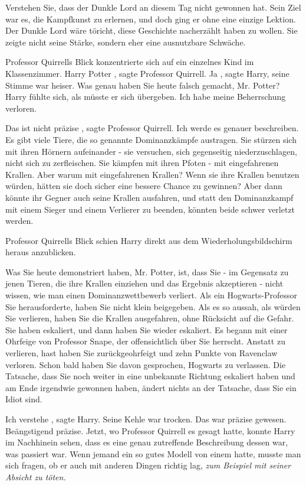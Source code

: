 Verstehen Sie, dass der Dunkle Lord an diesem Tag nicht gewonnen hat. Sein Ziel
war es, die Kampfkunst zu erlernen, und doch ging er ohne eine einzige Lektion.
Der Dunkle Lord wäre töricht, diese Geschichte nacherzählt haben zu wollen. Sie
zeigte nicht seine Stärke, sondern eher eine ausnutzbare Schwäche.\grqq{}

Professor Quirrells Blick konzentrierte sich auf ein einzelnes Kind im
Klassenzimmer. \glqq Harry Potter\grqq{} , sagte Professor Quirrell. \glqq
Ja\grqq{} , sagte Harry, seine Stimme war heiser. \glqq Was genau haben Sie
heute falsch gemacht, Mr. Potter?\grqq{} Harry fühlte sich, als müsste er sich
übergeben. \glqq Ich habe meine Beherrschung verloren.\grqq{}

\glqq Das ist nicht präzise\grqq{} , sagte Professor Quirrell. \glqq Ich werde
es genauer beschreiben. Es gibt viele Tiere, die so genannte Dominanzkämpfe
austragen. Sie stürzen sich mit ihren Hörnern aufeinander - sie versuchen, sich
gegenseitig niederzuschlagen, nicht sich zu zerfleischen. Sie kämpfen mit ihren
Pfoten - mit eingefahrenen Krallen. Aber warum mit eingefahrenen Krallen? Wenn
sie ihre Krallen benutzen würden, hätten sie doch sicher eine bessere Chance zu
gewinnen? Aber dann könnte ihr Gegner auch seine Krallen ausfahren, und statt
den Dominanzkampf mit einem Sieger und einem Verlierer zu beenden, könnten beide
schwer verletzt werden.\grqq{}

Professor Quirrells Blick schien Harry direkt aus dem Wiederholungsbildschirm
heraus anzublicken.

\glqq Was Sie heute demonstriert haben, Mr. Potter, ist, dass Sie - im Gegensatz
zu jenen Tieren, die ihre Krallen einziehen und das Ergebnis akzeptieren - nicht
wissen, wie man einen Dominanzwettbewerb verliert. Als ein Hogwarts-Professor
Sie herausforderte, haben Sie nicht klein beigegeben. Als es so aussah, als
würden Sie verlieren, haben Sie die Krallen ausgefahren, ohne Rücksicht auf die
Gefahr. Sie haben eskaliert, und dann haben Sie wieder eskaliert. Es begann mit
einer Ohrfeige von Professor Snape, der offensichtlich über Sie herrscht.
Anstatt zu verlieren, hast haben Sie zurückgeohrfeigt und zehn Punkte von
Ravenclaw verloren. Schon bald haben Sie davon gesprochen, Hogwarts zu
verlassen. Die Tatsache, dass Sie noch weiter in eine unbekannte Richtung
eskaliert haben und am Ende irgendwie gewonnen haben, ändert nichts an der
Tatsache, dass Sie ein Idiot sind.\grqq{}

\glqq Ich verstehe\grqq{} , sagte Harry. Seine Kehle war trocken. Das war
präzise gewesen. Beängstigend präzise. Jetzt, wo Professor Quirrell es gesagt
hatte, konnte Harry im Nachhinein sehen, dass es eine genau zutreffende
Beschreibung dessen war, was passiert war. Wenn jemand ein so gutes Modell von
einem hatte, musste man sich fragen, ob er auch mit anderen Dingen richtig lag,
\emph{zum Beispiel mit seiner Absicht zu töten.}

